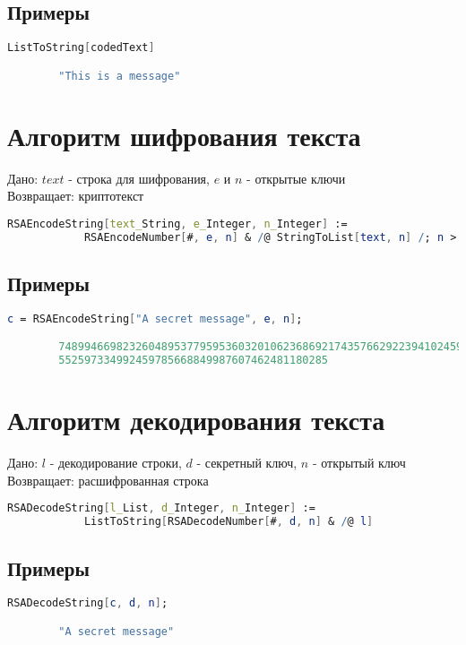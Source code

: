    	\subsection{Примеры}

    	\begin{lstlisting}[language=Mathematica,caption={
      		Пример	
    	}]
		ListToString[codedText]

		"This is a message"
    	\end{lstlisting}

	\section{Алгоритм шифрования текста}
		Дано: $text$ - строка для шифрования, $e$ и $n$ - открытые ключи \\
		Возвращает: криптотекст

		\begin{lstlisting}[language=Mathematica,caption={
      		Алгоритм шифрования текста
    	}]
		RSAEncodeString[text_String, e_Integer, n_Integer] := 
 			RSAEncodeNumber[#, e, n] & /@ StringToList[text, n] /; n > 256
    	\end{lstlisting}

    	\subsection{Примеры}

    	\begin{lstlisting}[language=Mathematica,caption={
      		Пример	
    	}]
		c = RSAEncodeString["A secret message", e, n];

		74899466982326048953779595360320106236869217435766292239410245927328265139809\
		552597334992459785668849987607462481180285
    	\end{lstlisting}

	\section{Алгоритм декодирования текста}
		Дано: $l$ - декодирование строки, $d$ - секретный ключ, $n$ - открытый ключ \\
		Возвращает: расшифрованная строка

		\begin{lstlisting}[language=Mathematica,caption={
      		Алгоритм шифрования текста
    	}]
		RSADecodeString[l_List, d_Integer, n_Integer] := 
 			ListToString[RSADecodeNumber[#, d, n] & /@ l]
    	\end{lstlisting}

    	\subsection{Примеры}

    	\begin{lstlisting}[language=Mathematica,caption={
      		Пример	
    	}]
		RSADecodeString[c, d, n];

		"A secret message"
    	\end{lstlisting}

